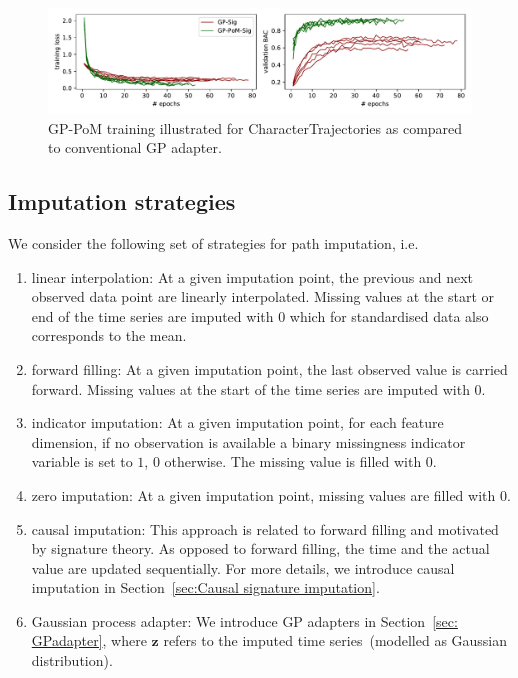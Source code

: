 \documentclass{article}
\begin{document}
\begin{figure}[tbp] 
    \begin{center}
    \includegraphics[width=0.95\linewidth]{plots/gp_training_plot.pdf}\quad%
  \end{center}
  \caption{GP-PoM training illustrated for CharacterTrajectories as compared to conventional GP adapter.}
  \label{supp: gp-training}
\end{figure}



\subsection{Imputation strategies} \label{supp: Imputation}

We consider the following set of strategies for path imputation, i.e.\
\begin{enumerate}
    \item linear interpolation: At a given imputation point, the previous and next observed data point are linearly interpolated. Missing values at the start or end of the time series are imputed with $0$ which for standardised data also corresponds to the mean.
    \item forward filling: At a given imputation point, the last observed value is carried forward. Missing values at the start of the time series are imputed with $0$.
    \item indicator imputation: At a given imputation point, for each feature dimension, if no observation is available a binary missingness indicator variable is set to $1$, $0$ otherwise. The missing value is filled with $0$.
    \item zero imputation: At a given imputation point, missing values are filled with $0$.
    \item causal imputation: This approach is related to forward filling
      and motivated by signature theory. As opposed to forward filling,
      the time and the actual value are updated sequentially. For more
      details, we introduce causal imputation in Section~\ref{sec:Causal signature imputation}.
    \item Gaussian process adapter: We introduce GP adapters in
      Section~\ref{sec: GPadapter}, where $\mathbf{z}$
      refers to the imputed time series~(modelled as Gaussian
      distribution).
\end{enumerate}
\end{document}
